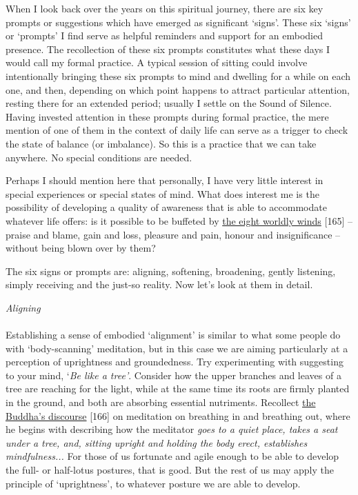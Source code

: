 When I look back over the years on this spiritual journey, there are six
key prompts or suggestions which have emerged as significant `signs'.
These six `signs' or `prompts' I find serve as helpful reminders and
support for an embodied presence. The recollection of these six prompts
constitutes what these days I would call my formal practice. A typical
session of sitting could involve intentionally bringing these six
prompts to mind and dwelling for a while on each one, and then,
depending on which point happens to attract particular attention,
resting there for an extended period; usually I settle on the Sound of
Silence. Having invested attention in these prompts during formal
practice, the mere mention of one of them in the context of daily life
can serve as a trigger to check the state of balance (or imbalance). So
this is a practice that we can take anywhere. No special conditions are
needed.

Perhaps I should mention here that personally, I have very little
interest in special experiences or special states of mind. What does
interest me is the possibility of developing a quality of awareness that
is able to accommodate whatever life offers: is it possible to be
buffeted by
\href{../../../../../../../../../G:/My\%20Drive/In\%20Any\%20Given\%20Moment/IAGM_Backups/AN\%208.6,\%20Lokavipatti\%20Sutta:\%20The\%20Failings\%20of\%20the\%20WorldThe\%20Eight\%20Worldly\%20Dhammas\%20are\%20described\%20as:\%20gain\%20andloss,\%20status\%20and\%20disgrace,\%20praise\%20and\%20blame,\%20pleasure\%20andpain.https://www.accesstoinsight.org/tipitaka/an/an08/an08.006.than.html}{the
eight worldly winds} {[}165{]} -- praise and blame, gain and loss,
pleasure and pain, honour and insignificance -- without being blown over
by them?

The six signs or prompts are: aligning, softening, broadening, gently
listening, simply receiving and the just-so reality. Now let's look at
them in detail.

\emph{Aligning\\
}~\\
Establishing a sense of embodied `alignment' is similar to what some
people do with `body-scanning' meditation, but in this case we are
aiming particularly at a perception of uprightness and groundedness. Try
experimenting with suggesting to your mind, `\emph{Be like a tree'}.
Consider how the upper branches and leaves of a tree are reaching for
the light, while at the same time its roots are firmly planted in the
ground, and both are absorbing essential nutriments. Recollect
\href{https://www.accesstoinsight.org/tipitaka/mn/mn.118.than.html}{the
Buddha's discourse} {[}166{]} on meditation on breathing in and
breathing out, where he begins with describing how the meditator
\emph{goes to a quiet place, takes a seat under a tree, and, sitting
upright and holding the body erect, establishes mindfulness...} For
those of us fortunate and agile enough to be able to develop the full-
or half-lotus postures, that is good. But the rest of us may apply the
principle of `uprightness', to whatever posture we are able to develop.

